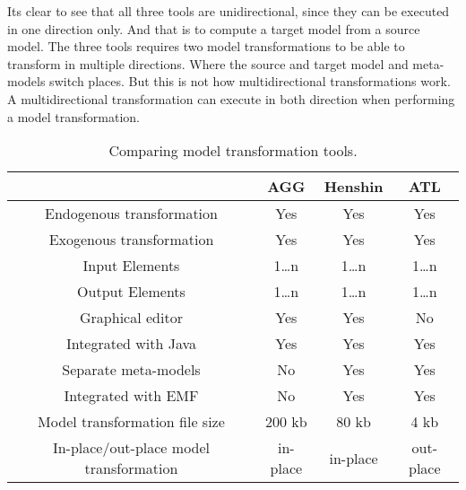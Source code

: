 Its clear to see that all three tools are unidirectional, since they can be
executed in one direction only. And that is to compute a target model from a
source model. The three tools requires two model transformations to be able to
transform in multiple directions. Where the source and target model and
meta-models switch places. But this is not how multidirectional transformations
work. A multidirectional transformation can execute in both direction when
performing a model transformation.

\begin{table}[ht]
\centering
\begin{tabular}{| c | c | c | c |}
\hline
 & AGG & Henshin & ATL \\
\hline
Endogenous transformation & \cellcolor{green!25}Yes &
\cellcolor{green!25}Yes & \cellcolor{green!25}Yes \\

Exogenous transformation & \cellcolor{green!25}Yes &
\cellcolor{green!25}Yes & \cellcolor{green!25}Yes \\

Input Elements & 1\ldots n & 1\ldots n & 1\ldots n\\
Output Elements & 1\ldots n & 1\ldots n & 1\ldots n\\
Graphical editor &\cellcolor{green!25}Yes &
\cellcolor{green!25}Yes &\cellcolor{red!25}No  \\
Integrated with Java & \cellcolor{green!25}Yes &
\cellcolor{green!25}Yes & \cellcolor{green!25}Yes \\
Separate meta-models & \cellcolor{red!25}No &
\cellcolor{green!25}Yes & \cellcolor{green!25}Yes \\
Integrated with EMF & \cellcolor{red!25}No &
\cellcolor{green!25}Yes & \cellcolor{green!25}Yes \\
Model transformation file size &200 kb &80 kb &4 kb \\
In-place/out-place model transformation &in-place &
in-place &out-place \\
\hline

\end{tabular}
\caption [Comparing model transformation tools]
{Comparing model transformation tools.}
\end{table}

\newpage


